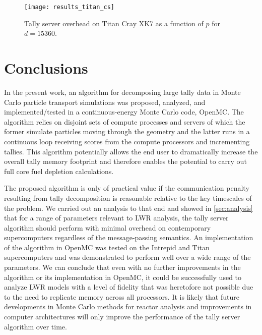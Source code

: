 \documentclass[3p,fleqn]{elsarticle}
\begin{document}
\begin{figure}[!tbh]
  \centering
  \texttt{[image: results\_titan\_cs]}
  \caption{Tally server overhead on Titan Cray XK7 as a function of $p$ for $d =
    15360$.}
  \label{fig:titan-cs}
\end{figure}

\section{Conclusions}

In the present work, an algorithm for decomposing large tally data in Monte
Carlo particle transport simulations was proposed, analyzed, and
implemented/tested in a continuous-energy Monte Carlo code, OpenMC. The
algorithm relies on disjoint sets of compute processes and servers of which the
former simulate particles moving through the geometry and the latter runs in a
continuous loop receiving scores from the compute processors and incrementing
tallies. This algorithm potentially allows the end user to dramatically increase
the overall tally memory footprint and therefore enables the potential to carry
out full core fuel depletion calculations.

The proposed algorithm is only of practical value if the communication penalty
resulting from tally decomposition is reasonable relative to the key timescales
of the problem. We carried out an analysis to that end and showed in
\autoref{sec:analysis} that for a range of parameters relevant to LWR analysis,
the tally server algorithm should perform with minimal overhead on contemporary
supercomputers regardless of the message-passing semantics. An implementation of
the algorithm in OpenMC was tested on the Intrepid and Titan supercomputers and
was demonstrated to perform well over a wide range of the parameters. We can
conclude that even with no further improvements in the algorithm or its
implementation in OpenMC, it could be successfully used to analyze LWR models
with a level of fidelity that was heretofore not possible due to the need to
replicate memory across all processors. It is likely that future developments in
Monte Carlo methods for reactor analysis and improvements in computer
architectures will only improve the performance of the tally server algorithm
over time.
\end{document}
